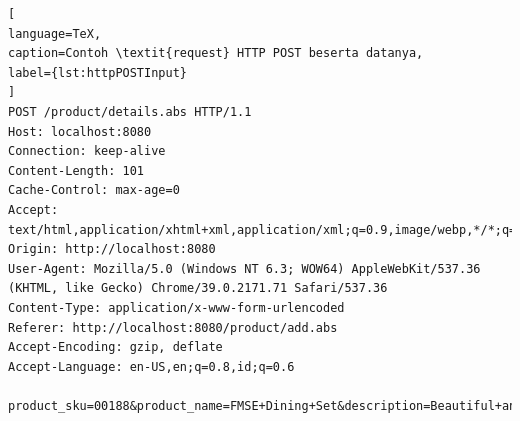 \begin{lstlisting}[
language=TeX,
caption=Contoh \textit{request} HTTP POST beserta datanya,
label={lst:httpPOSTInput}
]
POST /product/details.abs HTTP/1.1
Host: localhost:8080
Connection: keep-alive
Content-Length: 101
Cache-Control: max-age=0
Accept: text/html,application/xhtml+xml,application/xml;q=0.9,image/webp,*/*;q=0.8
Origin: http://localhost:8080
User-Agent: Mozilla/5.0 (Windows NT 6.3; WOW64) AppleWebKit/537.36 (KHTML, like Gecko) Chrome/39.0.2171.71 Safari/537.36
Content-Type: application/x-www-form-urlencoded
Referer: http://localhost:8080/product/add.abs
Accept-Encoding: gzip, deflate
Accept-Language: en-US,en;q=0.8,id;q=0.6

product_sku=00188&product_name=FMSE+Dining+Set&description=Beautiful+and+Cute+Dining+Set&price=250000
\end{lstlisting}


 